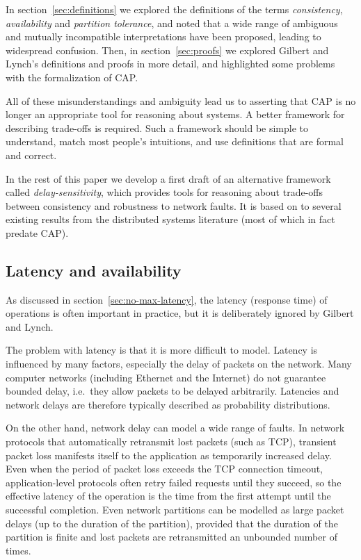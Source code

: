 \documentclass[a4paper,twocolumn,10pt]{article}
\begin{document}
In section~\ref{sec:definitions} we explored the definitions of the terms \emph{consistency},
\emph{availability} and \emph{partition tolerance}, and noted that a wide range of ambiguous and
mutually incompatible interpretations have been proposed, leading to widespread confusion. Then,
in section~\ref{sec:proofs} we explored Gilbert and Lynch's definitions and proofs in more detail,
and highlighted some problems with the formalization of CAP.

All of these misunderstandings and ambiguity lead us to asserting that CAP is no longer an
appropriate tool for reasoning about systems. A better framework for describing trade-offs is
required. Such a framework should be simple to understand, match most people's intuitions, and use
definitions that are formal and correct.

In the rest of this paper we develop a first draft of an alternative framework called
\emph{delay-sensitivity}, which provides tools for reasoning about trade-offs between consistency
and robustness to network faults. It is based on to several existing results from the distributed
systems literature (most of which in fact predate CAP).

\subsection{Latency and availability}\label{sec:latency-availability}

As discussed in section~\ref{sec:no-max-latency}, the latency (response time) of operations is often
important in practice, but it is deliberately ignored by Gilbert and Lynch.

The problem with latency is that it is more difficult to model. Latency is influenced by many
factors, especially the delay of packets on the network. Many computer networks (including Ethernet
and the Internet) do not guarantee bounded delay, i.e.\ they allow packets to be delayed
arbitrarily. Latencies and network delays are therefore typically described as probability
distributions.

On the other hand, network delay can model a wide range of faults. In network protocols that
automatically retransmit lost packets (such as TCP), transient packet loss manifests itself to the
application as temporarily increased delay. Even when the period of packet loss exceeds the TCP
connection timeout, application-level protocols often retry failed requests until they succeed, so
the effective latency of the operation is the time from the first attempt until the successful
completion. Even network partitions can be modelled as large packet delays (up to the duration of
the partition), provided that the duration of the partition is finite and lost packets are
retransmitted an unbounded number of times.
\end{document}
